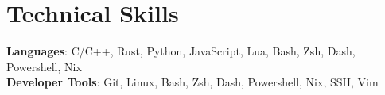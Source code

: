 \documentclass[letterpaper,11pt]{article}
\begin{document}
%
\section{Technical Skills}
 \begin{itemize}[leftmargin=0.15in, label={}]
    \small{\item{
     \textbf{Languages}{: C/C++, Rust, Python, JavaScript, Lua, Bash, Zsh, Dash, Powershell, Nix} \\
     \textbf{Developer Tools}{: Git, Linux, Bash, Zsh, Dash, Powershell, Nix, SSH, Vim} \\
    }}
 \end{itemize}


\end{document}
